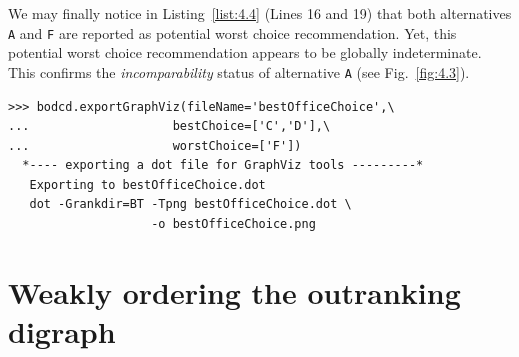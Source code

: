 We may finally notice in Listing~\vref{list:4.4} (Lines 16 and 19) that both alternatives \texttt{A} and \texttt{F} are reported as potential worst choice recommendation. Yet, this potential worst choice recommendation appears to be globally indeterminate. This confirms the \emph{incomparability} status of alternative \texttt{A} (see Fig.~\vref{fig:4.3}).
\begin{lstlisting}
>>> bodcd.exportGraphViz(fileName='bestOfficeChoice',\
...                    bestChoice=['C','D'],\
...                    worstChoice=['F'])
  *---- exporting a dot file for GraphViz tools ---------*
   Exporting to bestOfficeChoice.dot
   dot -Grankdir=BT -Tpng bestOfficeChoice.dot \
                    -o bestOfficeChoice.png
\end{lstlisting}

\section{Weakly ordering the outranking digraph}
\label{sec:4.6}

